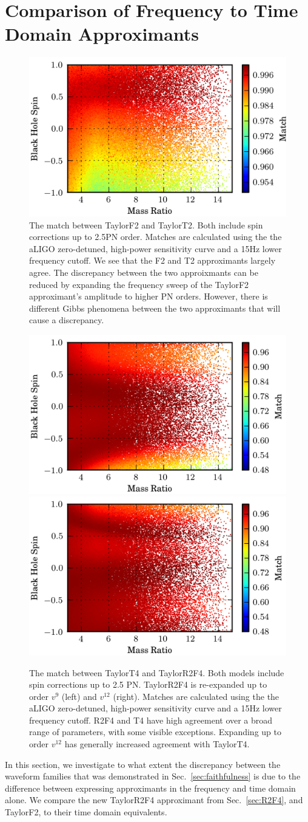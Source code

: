 \section{Comparison of Frequency to Time Domain Approximants}
\label{sec:freq_vs_time_approx}

\begin{figure}
\begin{center}
\includegraphics[width=1.0	extwidth]{papers/nsbh_faithfulness/figure7.png}
\end{center}
\caption{\label{fig:f2t2fs} The match between TaylorF2 and TaylorT2. Both include spin 
corrections up to 2.5\ac{PN} order.
Matches are calculated using the the aLIGO
zero-detuned, high-power sensitivity curve and a 15Hz lower frequency cutoff. 
We see that the F2 and T2 approximants largely agree. The discrepancy
between the two approixmants can be reduced by expanding the frequency sweep of
the TaylorF2 approximant's amplitude to higher \ac{PN} orders. However, there
is different Gibbs phenomena between the two approximants that will cause a
discrepancy.}

\end{figure}


\begin{figure}
\begin{minipage}[l]{\columnwidth}
\includegraphics[width=1.0	extwidth]{papers/nsbh_faithfulness/figure8A.png}
\includegraphics[width=1.0	extwidth]{papers/nsbh_faithfulness/figure8B.png}
\caption{\label{fig:f4t4fs}The match between TaylorT4 and TaylorR2F4. Both models include
spin corrections up to 2.5 \ac{PN}. TaylorR2F4 is  re-expanded up to order $v^9$ (left) 
and $v^{12}$ (right). Matches are calculated using the the aLIGO
zero-detuned, high-power sensitivity curve and a 15Hz lower frequency cutoff. R2F4 and T4 have
high agreement over a broad range of parameters, with some visible exceptions.
Expanding up to order $v^{12}$ has generally increased
agreement with TaylorT4. }
\end{minipage}
\end{figure}
In this section, we investigate to what extent the discrepancy between the waveform families that
was demonstrated in Sec.~\ref{sec:faithfulness} is due to the difference
between expressing approximants in the frequency and time domain alone.
We compare the new TaylorR2F4 approximant from
Sec.~\ref{sec:R2F4}, and TaylorF2, to their time domain equivalents.


